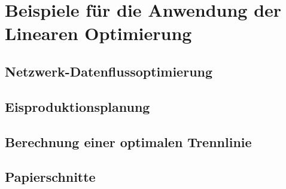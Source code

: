 \documentclass{scrartcl}
\begin{document}
\section{Beispiele für die Anwendung der Linearen Optimierung}

\subsection{Netzwerk-Datenflussoptimierung}

\subsection{Eisproduktionsplanung}

\subsection{Berechnung einer optimalen Trennlinie}

\subsection{Papierschnitte}

\end{document}
